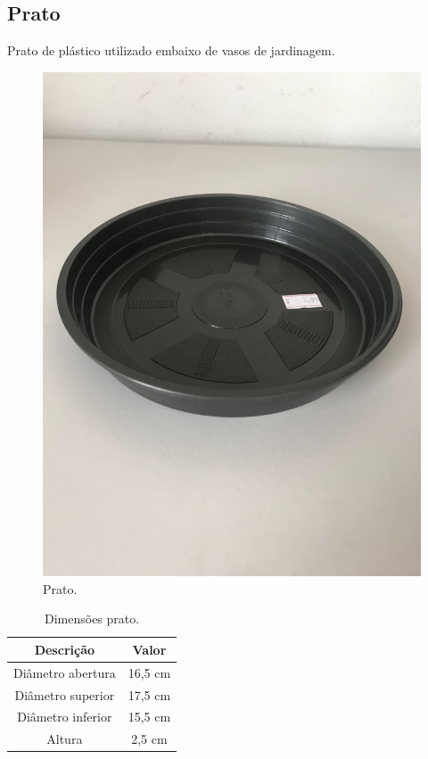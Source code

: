 \documentclass[
	12pt,				%
	openright,			%
	oneside,			%
	a4paper,			%
	chapter=TITLE,		%
	english,			%
	brazil				%
	]{abntex2}
\begin{document}
\subsection{Prato}

Prato de plástico utilizado embaixo de vasos de jardinagem.

\begin{multicols}{2}
\begin{figure}[H]
    \centering
    \includegraphics[scale=0.04, angle=-90]{imagens/IMG_0599.jpg}
    \caption{Prato.}
    \label{fig:prato}
\end{figure}    

\begin{table}[H]
    \centering
    \caption{Dimensões prato.}
    \label{tab:prato} 
    \begin{tabular}{ |c|c| }                           
        \hline
        \rowcolor{lightgray} \textbf{Descrição} & \textbf{Valor}\\
        \hline
        Diâmetro abertura & 16,5 cm \\
        \hline
        Diâmetro superior & 17,5 cm \\
        \hline
        Diâmetro inferior & 15,5 cm \\
        \hline
        Altura & 2,5 cm \\
        \hline
    \end{tabular}  
\end{table}
\end{multicols}
\end{document}
